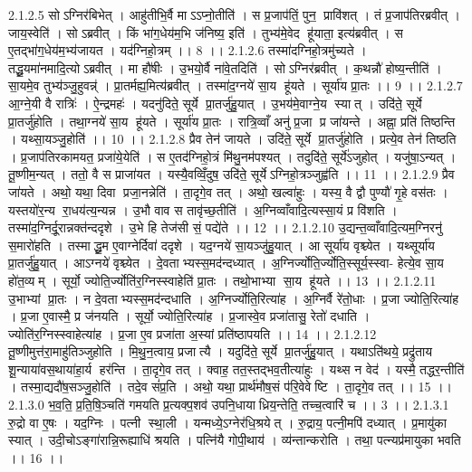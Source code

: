 2.1.2.5
सोऽग्निर॑बिभेत् । आहु॑तीभि॒र्वै माऽऽप्नो॒तीति॑ । स प्र॒जाप॑तिं॒ पुन॒ प्रावि॑शत् । तं प्र॒जाप॑तिरब्रवीत् । जाय॒स्वेति॑ । सोऽब्रवीत् । किं भा॑ग॒धेय॑म॒भि ज॑निष्य॒ इति॑ । तुभ्य॑मे॒वेद हू॑याता॒ इत्य॑ब्रवीत् । स ए॒तद्भा॑ग॒धेय॑म॒भ्य॑जायत । यद॑ग्निहो॒त्रम् ।। 8 ।।
2.1.2.6
तस्मा॑दग्निहो॒त्रमु॑च्यते । तद्धू॒यमा॑नमादि॒त्योऽब्रवीत् । मा हौ॑षीः । उ॒भयो॒र्वै ना॑वे॒तदिति॑ । सोऽग्निर॑ब्रवीत् । क॒थन्नौ॑ होष्य॒न्तीति॑ । सा॒यमे॒व तुभ्य॑ञ्जु॒हुवन्न्॑ । प्रा॒तर्मह्य॒मित्य॑ब्रवीत् । तस्मा॑द॒ग्नये॑ सा॒य हू॑यते । सूर्या॑य प्रा॒तः ।। 9 ।।
2.1.2.7
आ॒ग्ने॒यी वै रात्रिः॑ । ऐ॒न्द्रमहः॑ । यदनु॑दिते॒ सूर्ये प्रा॒तर्जु॑हु॒यात् । उ॒भय॑मे॒वाग्ने॒य स्यात् । उदि॑ते॒ सूर्ये प्रा॒तर्जु॑होति । तथा॒ग्नये॑ सा॒य हू॑यते । सूर्या॑य प्रा॒तः । रात्रि॒व्वाँ अनु॑ प्र॒जा प्र जा॑यन्ते । अह्ना॒ प्रति॑ तिष्ठन्ति । यथ्सा॒यञ्जु॒होति॑ ।। 10 ।।
2.1.2.8
प्रैव तेन॑ जायते । उदि॑ते॒ सूर्ये प्रा॒तर्जु॑होति । प्रत्ये॒व तेन॑ तिष्ठति । प्र॒जाप॑तिरकामयत॒ प्रजा॑ये॒येति॑ । स ए॒तद॑ग्निहो॒त्रं मि॑थु॒नम॑पश्यत् । तदुदि॑ते॒ सूर्ये॑ऽजुहोत् । यजु॑षा॒ऽन्यत् । तू॒ष्णीम॒न्यत् । ततो॒ वै स प्राजा॑यत । यस्यै॒वव्विँ॒दुष॒ उदि॑ते॒ सूर्येऽग्निहो॒त्रञ्जुह्व॑ति ।। 11 ।।
2.1.2.9
प्रैव जा॑यते । अथो॒ यथा॒ दिवा प्रजा॒नन्नेति॑ । ता॒दृगे॒व तत् । अथो॒ खल्वा॑हुः । यस्य॒ वै द्वौ पुण्यौ॑ गृ॒हे वस॑तः । यस्तयो॑र॒न्य रा॒धय॑त्य॒न्यन्न । उ॒भौ वाव स तावृ॑च्छ॒तीति॑ । अ॒ग्निव्वाँवादि॒त्यस्सा॒यं प्र वि॑शति । तस्मा॑द॒ग्निर्दू॒रान्नक्त॑न्ददृशे । उ॒भे हि तेज॑सी सं॒ पद्ये॑ते ।। 12 ।।
2.1.2.10
उ॒द्यन्त॒व्वाँवादि॒त्यम॒ग्निरनु॑ स॒मारो॑हति । तस्माद्धू॒म ए॒वाग्नेर्दिवा॑ ददृशे । यद॒ग्नये॑ सा॒यञ्जु॑हु॒यात् । आ सूर्या॑य वृश्च्येत । यथ्सूर्या॑य प्रा॒तर्जु॑हु॒यात् । आऽग्नये॑ वृश्च्येत । दे॒वताभ्यस्स॒मद॑न्दध्यात् । अ॒ग्निर्ज्योति॒र्ज्योति॒स्सूर्य॒स्स्वा- हेत्ये॒व सा॒य हो॑त॒व्यम् । सूर्यो॒ ज्योति॒र्ज्योति॑र॒ग्निस्स्वाहेति॑ प्रा॒तः । तथो॒भाभ्या॑ सा॒य हू॑यते ।। 13 ।।
2.1.2.11
उ॒भाभ्यां प्रा॒तः । न दे॒वताभ्यस्स॒मद॑न्दधाति । अ॒ग्निर्ज्योति॒रित्या॑ह । अ॒ग्निर्वै रे॑तो॒धाः । प्र॒जा ज्योति॒रित्या॑ह । प्र॒जा ए॒वास्मै॒ प्र ज॑नयति । सूर्यो॒ ज्योति॒रित्या॑ह । प्र॒जास्वे॒व प्रजा॑तासु॒ रेतो॑ दधाति । ज्योति॑र॒ग्निस्स्वाहेत्या॑ह । प्र॒जा ए॒व प्रजा॑ता अ॒स्यां प्रति॑ष्ठापयति ।। 14 ।।
2.1.2.12
तू॒ष्णीमुत्त॑रा॒माहु॑तिञ्जुहोति । मि॒थु॒न॒त्वाय॒ प्रजात्यै । यदुदि॑ते॒ सूर्ये प्रा॒तर्जु॑हु॒यात् । यथाऽति॑थये॒ प्रद्रु॑ताय शू॒न्याया॑वस॒थाया॑हा॒र्य॑ हर॑न्ति । ता॒दृगे॒व तत् । क्वाह॒ तत॒स्तद्भव॒तीत्या॑हुः । यथ्स न वेद॑ । यस्मै॒ तद्धर॒न्तीति॑ । तस्मा॒द्यदौ॑ष॒सञ्जु॒होति॑ । तदे॒व सं॑प्र॒ति । अथो॒ यथा॒ प्रार्थ॑मौष॒सं प॑रि॒वेवेष्टि । ता॒दृगे॒व तत् ।। 15 ।।
2.1.3.0
भ॒व॒ति॒ प्र॒ति॒षि॒ञ्चति॑ गमयति प्र॒त्यक्प॒शव॑ उपनि॒धायाध्रिय॒न्तेति॒ तच्च॒त्वारि॑ च ।। 3 ।।
2.1.3.1
रु॒द्रो वा ए॒षः । यद॒ग्निः । पत्नी स्था॒ली । यन्मध्ये॒ऽग्नेर॑धि॒श्रयेत् । रु॒द्राय॒ पत्नी॒मपि॑ दध्यात् । प्र॒मायु॑का स्यात् । उदी॒चोऽङ्गा॑रान्नि॒रूह्याधि॑ श्रयति । पत्नि॑यै गोपी॒थाय॑ । व्य॑न्तान्करोति । तथा॒ पत्न्यप्र॑मायुका भवति ।। 16 ।।
